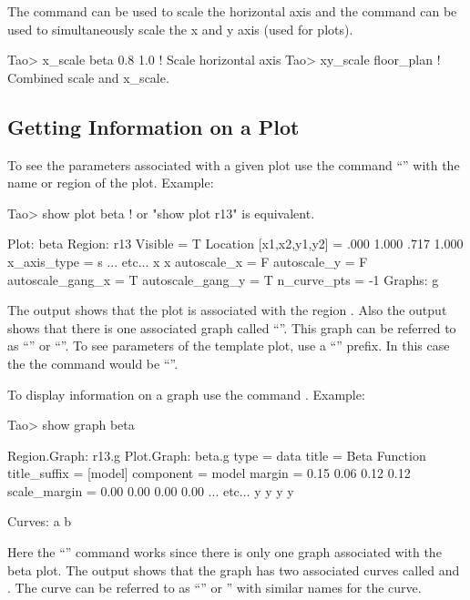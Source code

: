 \documentclass{hitec}     %
\begin{document}
The  command can be used to scale the horizontal axis and
the  command can be used to simultaneously scale the x and y axis 
(used for  plots).
\begin{code}
Tao> x_scale beta 0.8 1.0   ! Scale horizontal axis
Tao> xy_scale floor_plan    ! Combined scale and x_scale.
\end{code}

\subsection{Getting Information on a Plot}

To see the parameters associated with a given plot use the command ``''
with the name or region of the plot. Example:
\begin{code}
Tao> show plot beta  ! or "show plot r13" is equivalent.

Plot:  beta
Region:  r13
Visible                = T
Location [x1,x2,y1,y2] = .000  1.000  .717  1.000
x_axis_type          = s
... etc...
x%
x%
autoscale_x          = F
autoscale_y          = F
autoscale_gang_x     = T
autoscale_gang_y     = T
n_curve_pts          = -1
Graphs:
   g
\end{code}
The output shows that the  plot is associated with the region . Also the
output shows that there is one associated graph called ``''. This graph can be referred
to as ``'' or ``''. To see parameters of the  template plot,
use a ``'' prefix. In this case the the command would be ``''.

To display information on a graph use the command . Example:
\begin{code}
Tao> show graph beta

Region.Graph: r13.g
Plot.Graph:   beta.g
type                             = data
title                            = Beta Function
title_suffix                     = [model]
component                        = model
margin                           =   0.15    0.06    0.12    0.12  %
scale_margin                     =   0.00    0.00    0.00    0.00  %
... etc...
y%
y%
y%
y%

Curves:
   a
   b
\end{code}
Here the ``'' command works since there is only one graph associated with the
beta plot. The output shows that the graph has two associated curves called  and .
The  curve can be referred to as ``'' or '' with similar names for
the  curve.
\end{document}

